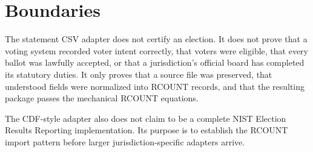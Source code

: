 \section{Boundaries}

The statement CSV adapter does not certify an election. It does not prove that a
voting system recorded voter intent correctly, that voters were eligible, that
every ballot was lawfully accepted, or that a jurisdiction's official board has
completed its statutory duties. It only proves that a source file was preserved,
that understood fields were normalized into RCOUNT records, and that the
resulting package passes the mechanical RCOUNT equations.

The CDF-style adapter also does not claim to be a complete NIST Election Results
Reporting implementation. Its purpose is to establish the RCOUNT import pattern
before larger jurisdiction-specific adapters arrive.
